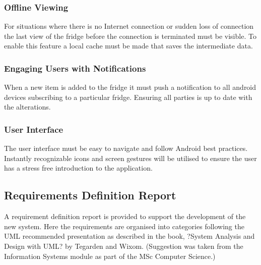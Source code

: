 \documentclass[a4paper, 11pt]{article}
\begin{document}
\subsubsection{Offline Viewing}
For situations where there is no Internet connection or sudden loss of connection the last view of the fridge before the connection is terminated must be visible. To enable this feature a local cache must be made that saves the intermediate data.

\subsubsection{Engaging Users with Notifications}
When a new item is added to the fridge it must push a notification to all android devices subscribing to a particular fridge.  Ensuring all parties is up to date with the alterations. 

\subsubsection{User Interface}
The user interface must be easy to navigate and follow Android best practices. Instantly recognizable icons and screen gestures will be utilised to ensure the user has a stress free introduction to the application.

\subsection{Requirements Definition Report}
A requirement definition report is provided to support the development of the new system. Here the requirements are organised into categories following the UML recommended presentation as described in the book, ?System Analysis and Design with UML? by Tegarden and Wixom. (Suggestion was taken from the Information Systems module as part of the MSc Computer Science.)
\end{document}
